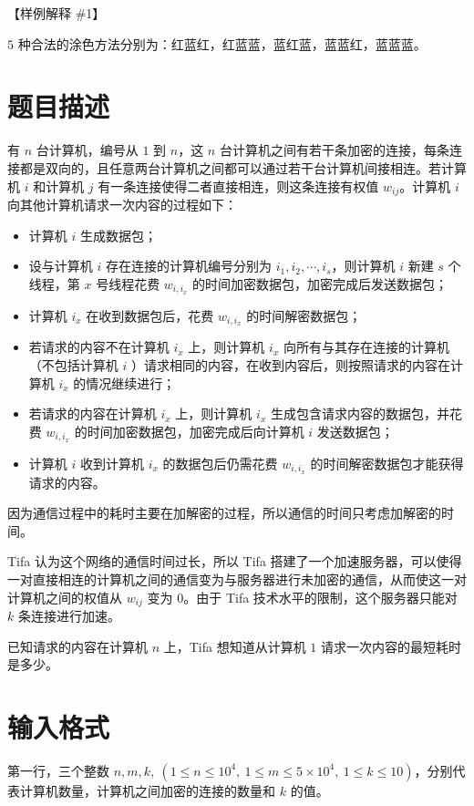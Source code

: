 \documentclass{../cpct/ctpro}
\begin{document}
【样例解释 \#1】

$5$ 种合法的涂色方法分别为：红蓝红，红蓝蓝，蓝红蓝，蓝蓝红，蓝蓝蓝。

\makeproblem
\section*{题目描述}

有 $n$ 台计算机，编号从 $1$ 到 $n$，这 $n$ 台计算机之间有若干条加密的连接，每条连接都是双向的，且任意两台计算机之间都可以通过若干台计算机间接相连。若计算机 $i$ 和计算机 $j$ 有一条连接使得二者直接相连，则这条连接有权值 $w_{ij}$。计算机 $i$ 向其他计算机请求一次内容的过程如下：

\begin{itemize}
    \item 计算机 $i$ 生成数据包；
    \item 设与计算机 $i$ 存在连接的计算机编号分别为 $i_1,i_2,\cdots,i_s$，则计算机 $i$ 新建 $s$ 个线程，第 $x$ 号线程花费 $w_{i,i_x}$ 的时间加密数据包，加密完成后发送数据包；
    \item 计算机 $i_x$ 在收到数据包后，花费 $w_{i,i_x}$ 的时间解密数据包；
    \item 若请求的内容不在计算机 $i_x$ 上，则计算机 $i_x$ 向所有与其存在连接的计算机（不包括计算机 $i$ ）请求相同的内容，在收到内容后，则按照请求的内容在计算机 $i_x$ 的情况继续进行；
    \item 若请求的内容在计算机 $i_x$ 上，则计算机 $i_x$ 生成包含请求内容的数据包，并花费 $w_{i,i_x}$ 的时间加密数据包，加密完成后向计算机 $i$ 发送数据包；
    \item 计算机 $i$ 收到计算机 $i_x$ 的数据包后仍需花费 $w_{i,i_x}$ 的时间解密数据包才能获得请求的内容。
\end{itemize}

因为通信过程中的耗时主要在加解密的过程，所以通信的时间只考虑加解密的时间。

Tifa 认为这个网络的通信时间过长，所以 Tifa 搭建了一个加速服务器，可以使得一对直接相连的计算机之间的通信变为与服务器进行未加密的通信，从而使这一对计算机之间的权值从 $w_{ij}$ 变为 $0$。由于 Tifa 技术水平的限制，这个服务器只能对 $k$ 条连接进行加速。

已知请求的内容在计算机 $n$ 上，Tifa 想知道从计算机 $1$ 请求一次内容的最短耗时是多少。

\section*{输入格式}

第一行，三个整数 $n,m,k,~(1 \leq n \leq {10}^4,~1 \leq m \leq 5 \times {10}^4,~1 \leq k \leq 10)$，分别代表计算机数量，计算机之间加密的连接的数量和 $k$ 的值。
\end{document}
